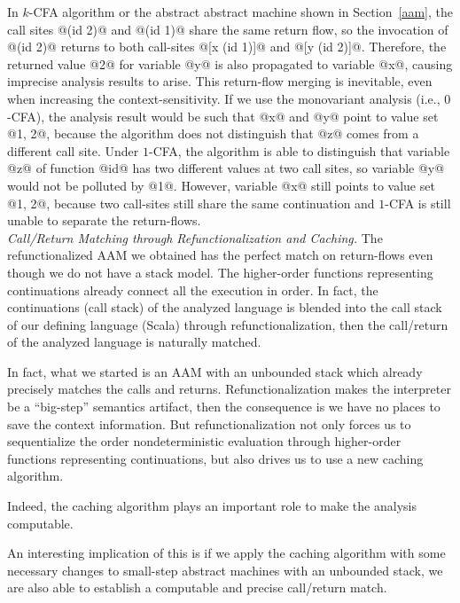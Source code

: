 \documentclass[acmsmall, review]{acmart}\settopmatter{}
\begin{document}
In $k$-CFA algorithm or the abstract abstract machine shown in Section~\ref{aam},
the call sites @(id 2)@ and @(id 1)@ share the same return flow,
so the invocation of @(id 2)@ returns to both call-sites @[x (id 1)]@ and @[y (id 2)]@.
Therefore, the returned value @2@ for variable @y@ is also propagated to
variable @x@, causing imprecise analysis results to arise.
This return-flow merging is inevitable, even when increasing the context-sensitivity.
If we use the monovariant analysis (i.e., $0$-CFA), the analysis result would be such 
that @x@ and @y@ point to value set @{1, 2}@, because the algorithm does not distinguish 
that @z@ comes from a different call site.
Under $1$-CFA, the algorithm is able to distinguish that variable @z@ of function
@id@ has two different values at two call sites, so variable @y@
would not be polluted by @1@.
However, variable @x@ still points to value set @{1, 2}@, because two call-sites still 
share the same continuation and $1$-CFA is still unable to separate the return-flows. \\

\textit{Call/Return Matching through Refunctionalization and Caching.}
The refunctionalized AAM we obtained has the perfect match on return-flows even though 
we do not have a stack model. The higher-order functions representing continuations 
already connect all the execution in order. In fact, the continuations (call stack) 
of the analyzed language is blended into the call stack of our defining language 
(Scala) through refunctionalization, then the call/return of the analyzed language 
is naturally matched.

In fact, what we started is an AAM with an unbounded stack which already precisely 
matches the calls and returns.
Refunctionalization makes the interpreter be a ``big-step'' semantics artifact, 
then the consequence is we have no places to save the context information. 
But refunctionalization not only forces us to sequentialize the order nondeterministic 
evaluation through higher-order functions representing continuations, 
but also drives us to use a new caching algorithm.  

Indeed, the caching algorithm plays an important role to make the analysis computable. 

An interesting implication of this is if we apply the caching algorithm with some 
necessary changes to small-step abstract machines with an unbounded stack, 
we are also able to establish a computable and precise call/return match.

\end{document}
